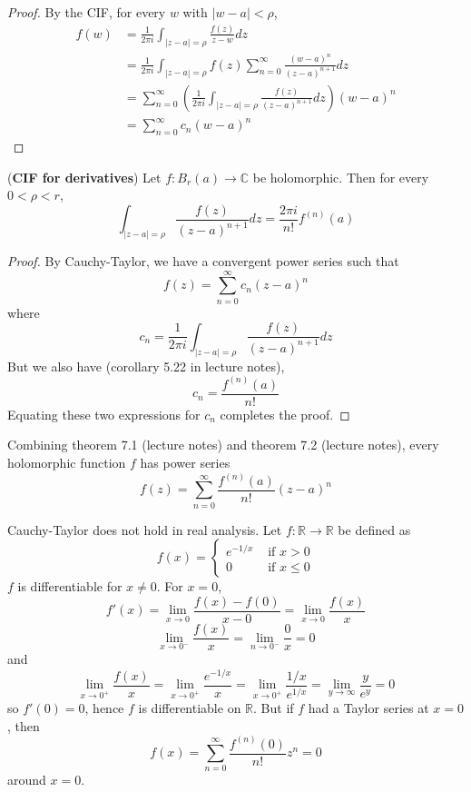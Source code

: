 \begin{proof}
	By the CIF, for every $w$ with $|w - a| < \rho$,
	\[
		\begin{aligned}
			f(w)
				& = \frac{1}{2 \pi i} \int_{|z - a| = \rho} \frac{f(z)}{z - w} dz \\
				& = \frac{1}{2 \pi i} \int_{|z - a| = \rho} f(z) \sum_{n = 0}^{\infty} \frac{{(w - a)}^n}{{(z - a)}^{n + 1}} dz \\
				& = \sum_{n = 0}^{\infty} \left( \frac{1}{2 \pi i} \int_{|z - a| = \rho} \frac{f(z)}{{(z - a)}^{n + 1}} dz \right) {(w - a)}^n \\
				& = \sum_{n = 0}^{\infty} c_n {(w - a)}^n
		\end{aligned}
	\]
\end{proof}

\begin{theorem}
	(\textbf{CIF for derivatives}) Let $f: B_r(a) \rightarrow \mathbb{C}$ be holomorphic. Then for every $0 < \rho < r$,
	\[
		\int_{|z - a| = \rho} \frac{f(z)}{{(z - a)}^{n + 1}} dz = \frac{2 \pi i}{n!} f^{(n)} (a)
	\]
\end{theorem}

\begin{proof}
	By Cauchy-Taylor, we have a convergent power series such that
	\[
		f(z) = \sum_{n = 0}^{\infty} c_n {(z - a)}^n
	\]
	where
	\[
		c_n = \frac{1}{2 \pi i} \int_{|z - a| = \rho} \frac{f(z)}{{(z - a)}^{n + 1}} dz
	\]
	But we also have (corollary 5.22 in lecture notes),
	\[
		c_n = \frac{f^{(n)} (a)}{n!}
	\]
	Equating these two expressions for $c_n$ completes the proof.
\end{proof}

\begin{remark}
	Combining theorem 7.1 (lecture notes) and theorem 7.2 (lecture notes), every holomorphic function $f$ has power series
	\[
		f(z) = \sum_{n = 0}^{\infty} \frac{f^{(n)} (a)}{n!} {(z - a)}^n
	\]
\end{remark}

\begin{remark}
	Cauchy-Taylor does not hold in real analysis. Let $f: \mathbb{R} \rightarrow \mathbb{R}$ be defined as
	\[
		f(x) = \begin{cases}
			e^{-1 / x} & \text{ if } x > 0 \\
			0 & \text{ if } x \le 0
		\end{cases}
	\]
	$f$ is differentiable for $x \ne 0$. For $x = 0$,
	\[
		f'(x) = \lim_{x \rightarrow 0} \frac{f(x) - f(0)}{x - 0} = \lim_{x \rightarrow 0} \frac{f(x)}{x}
	\]
	\[
		\lim_{x \rightarrow 0^-} \frac{f(x)}{x} = \lim_{n \rightarrow 0^-} \frac{0}{x} = 0
	\]
	and
	\[
		\lim_{x \rightarrow 0^+} \frac{f(x)}{x} = \lim_{x \rightarrow 0^+} \frac{e^{-1 / x}}{x} = \lim_{x \rightarrow 0^+} \frac{1 / x}{e^{1 / x}} = \lim_{y \rightarrow \infty} \frac{y}{e^y} = 0
	\]
	so $f'(0) = 0$, hence $f$ is differentiable on $\mathbb{R}$. But if $f$ had a Taylor series at $x = 0$, then
	\[
		f(x) = \sum_{n = 0}^{\infty} \frac{f^{(n)} (0)}{n!} z^n = 0
	\]
	around $x = 0$.
\end{remark}

